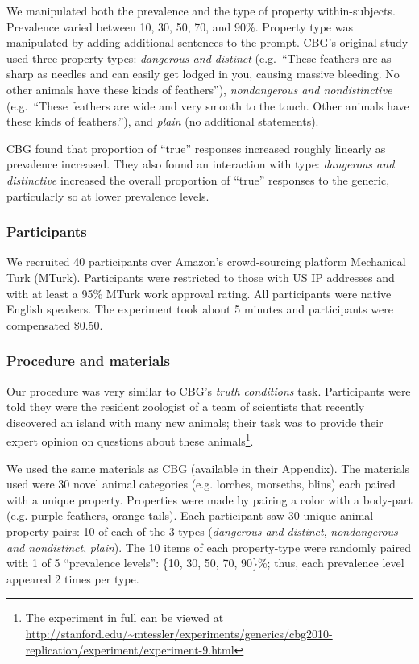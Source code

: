 \documentclass[10pt,letterpaper]{article}
\begin{document}
We manipulated both the prevalence and the type of property within-subjects. Prevalence varied between 10, 30, 50, 70, and 90\%. Property type was manipulated by adding additional sentences to the prompt. CBG's original study used three property types: \emph{dangerous and distinct} (e.g.~``These feathers are as sharp as needles and can easily get lodged in you, causing massive bleeding. No other animals have these kinds of feathers''), \emph{nondangerous and nondistinctive} (e.g.~``These feathers are wide and very smooth to the touch. Other animals have these kinds of feathers.''), and \emph{plain} (no additional statements). 

CBG found that proportion of ``true'' responses increased roughly linearly as prevalence increased. They also found an interaction with type: \emph{dangerous and distinctive} increased the overall proportion of ``true'' responses to the generic, particularly so at lower prevalence levels. 

\subsubsection{Participants}

We recruited 40 participants over Amazon's crowd-sourcing platform Mechanical Turk (MTurk).  Participants were restricted to those with US IP addresses and with at least a 95\% MTurk work approval rating. All participants were native English speakers. The experiment took about 5 minutes and participants were compensated \$0.50.

\subsubsection{Procedure and materials}

Our procedure was very similar to CBG's \emph{truth conditions} task. Participants were told they were the resident zoologist of a team of scientists that recently discovered an island with many new animals; their task was to provide their expert opinion on questions about these animals\footnote{The experiment in full can be viewed at \url{http://stanford.edu/~mtessler/experiments/generics/cbg2010-replication/experiment/experiment-9.html}}. 

 
We used the same materials as CBG (available in their Appendix). The materials used were 30 novel animal categories (e.g. lorches, morseths, blins) each paired with a unique property. Properties were made by pairing a color with a body-part (e.g. purple feathers, orange tails). Each participant saw 30 unique animal-property pairs: 10 of each of the 3 types (\emph{dangerous and distinct}, \emph{nondangerous and nondistinct}, \emph{plain}). The 10 items of each property-type were randomly paired with 1 of 5 ``prevalence levels'': \{10, 30, 50, 70, 90\}\%; thus, each prevalence level appeared 2 times per type. 
\end{document}
